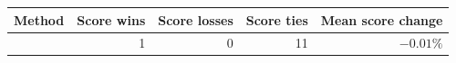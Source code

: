 \begin{tabular}{lrrrr}
\toprule
Method & Score wins & Score losses & Score ties & Mean score change \\
\midrule
\method{} & 1 & 0 & 11 & $-0.01\%$ \\
\bottomrule
\end{tabular}
